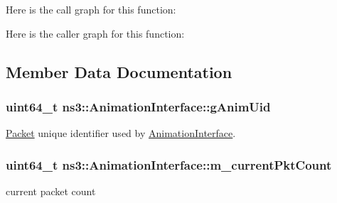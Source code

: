 Here is the call graph for this function\+:




Here is the caller graph for this function\+:




\subsection{Member Data Documentation}
\subsubsection[{\texorpdfstring{g\+Anim\+Uid}{gAnimUid}}]{\setlength{\rightskip}{0pt plus 5cm}uint64\+\_\+t ns3\+::\+Animation\+Interface\+::g\+Anim\+Uid\hspace{0.3cm}{\ttfamily [private]}}\hypertarget{classns3_1_1AnimationInterface_a98ecb4d4c024e52171b3154f09b7bcc2}{}\label{classns3_1_1AnimationInterface_a98ecb4d4c024e52171b3154f09b7bcc2}


\hyperlink{classns3_1_1Packet}{Packet} unique identifier used by \hyperlink{classns3_1_1AnimationInterface}{Animation\+Interface}. 

\subsubsection[{\texorpdfstring{m\+\_\+current\+Pkt\+Count}{m_currentPktCount}}]{\setlength{\rightskip}{0pt plus 5cm}uint64\+\_\+t ns3\+::\+Animation\+Interface\+::m\+\_\+current\+Pkt\+Count\hspace{0.3cm}{\ttfamily [private]}}\hypertarget{classns3_1_1AnimationInterface_ab04001286c72f63783361f1eca515f18}{}\label{classns3_1_1AnimationInterface_ab04001286c72f63783361f1eca515f18}


current packet count 

